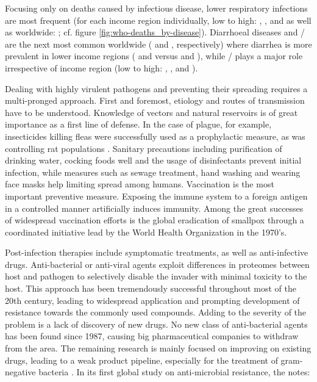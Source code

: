 

Focusing only on deaths caused by infectious disease, lower respiratory infections are most frequent (for each income region individually, low to high: \knitrPercentageInfectTwelveLowLRI{}, \knitrPercentageInfectTwelveLmidLRI{}, \knitrPercentageInfectTwelveUmidLRI{} and \knitrPercentageInfectTwelveHighLRI{} as well as worldwide: \knitrPercentageInfectTwelveWorldLRI{}; cf. figure \ref{fig:who-deaths_by-disease}). Diarrhoeal diseases and \slash {} are the next most common worldwide (\knitrPercentageInfectTwelveWorldDiarr{} and \knitrPercentageInfectTwelveWorldAIDS{}, respectively) where diarrhea is more prevalent in lower income regions (\knitrPercentageInfectTwelveLowDiarr{} and \knitrPercentageInfectTwelveLmidDiarr{} versus \knitrPercentageInfectTwelveUmidDiarr{} and \knitrPercentageInfectTwelveHighDiarr{}), while \slash {} plays a major role irrespective of income region (low to high: \knitrPercentageInfectTwelveLowAIDS{}, \knitrPercentageInfectTwelveLmidAIDS{}, \knitrPercentageInfectTwelveUmidAIDS{} and \knitrPercentageInfectTwelveHighAIDS{}).

Dealing with highly virulent pathogens and preventing their spreading requires a multi-pronged approach. First and foremost, etiology and routes of transmission have to be understood. Knowledge of vectors and natural reservoirs is of great importance as a first line of defense. In the case of plague, for example, insecticides killing fleas were successfully used as a prophylactic measure, as was controlling rat populations \citep{Barnes1990}. Sanitary precautions including purification of drinking water, cocking foods well and the usage of disinfectants prevent initial infection, while measures such as sewage treatment, hand washing and wearing face masks help limiting spread among humans. Vaccination is the most important preventive measure. Exposing the immune system to a foreign antigen in a controlled manner artificially induces immunity. Among the great successes of widespread vaccination efforts is the global eradication of smallpox through a coordinated initiative lead by the World Health Organization in the 1970's.

Post-infection therapies include symptomatic treatments, as well as anti-in\-fec\-tive drugs. Anti-bacterial or anti-viral agents exploit differences in proteomes between host and pathogen to selectively disable the invader with minimal toxicity to the host. This approach has been tremendously successful throughout most of the 20th century, leading to widespread application and prompting development of resistance towards the commonly used compounds. Adding to the severity of the problem is a lack of discovery of new drugs. No new class of anti-bacterial agents has been found since 1987, causing big pharmaceutical companies to withdraw from the area. The remaining research is mainly focused on improving on existing drugs, leading to a weak product pipeline, especially for the treatment of gram-negative bacteria \citep{Silver2011}. In its first global study on anti-microbial resistance, the \citet{WHO2014} notes:

